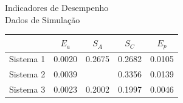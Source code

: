 \documentclass{beamer}
\begin{document}
\begin{frame}{Indicadores de Desempenho\\Dados de Simulação}

    \begin{table}[bt]
        \centering
    \begin{tabular}{lcccc}
        \toprule
        & $E_a$ & $S_A$ & $S_C$ & $E_p$ \\
        \midrule
        Sistema 1 & 0.0020 & 0.2675 & 0.2682 & 0.0105 \\
        Sistema 2 & 0.0039 & & 0.3356 & 0.0139 \\
        Sistema 3 & 0.0023 & 0.2002 & 0.1997 & 0.0046 \\
        \bottomrule
    \end{tabular}
    \end{table}


\end{frame}
\end{document}
